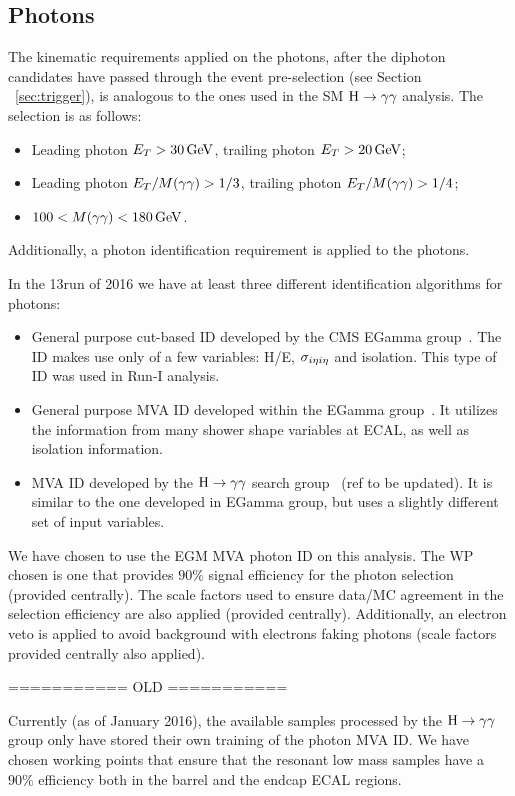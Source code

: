 \subsection{Photons}
\label{sec:photons}

The kinematic requirements applied on the photons, after the diphoton candidates have passed through the event pre-selection (see Section ~\ref{sec:trigger}), is analogous to the ones used in the SM $\mathrm{H}\to\gamma\gamma$ analysis. The selection is as follows:
\begin{itemize}
\item Leading photon $E_{T} > 30 \,\text{Ge\hspace{-.08em}V}$, trailing photon $E_{T}>20 \,\text{Ge\hspace{-.08em}V}$;
\item Leading photon $E_{T}/M(\gamma\gamma) > 1/3$, trailing photon $E_{T}/M(\gamma\gamma) > 1/4$;
\item $100 < M(\gamma\gamma) < 180 \,\text{Ge\hspace{-.08em}V}$.
\end{itemize}
Additionally, a photon identification requirement is applied to the photons.

In the 13\TeV run of 2016 we have at least three different identification algorithms for
photons:
\begin{itemize}
\item General purpose cut-based ID developed by the CMS EGamma
  group~\cite{PhotonCutBasedID-twiki}. The ID makes use only of a few variables: H/E,
  $\sigma_{i\eta i\eta}$ and isolation. This type of ID was used in Run-I analysis.
\item General purpose MVA ID developed within the EGamma
  group~\cite{PhotonMvaID-twiki}. It utilizes the information from many shower shape
  variables at ECAL, as well as isolation information.
\item MVA ID developed by the $\mathrm{H}\to\gamma\gamma$ search group~\cite{HggMvaID-slides} (ref to be
  updated). It is similar to the one developed in EGamma group, but uses a slightly
  different set of input variables.
\end{itemize}

We have chosen to use the EGM MVA photon ID on this analysis. 
The WP chosen is one that provides $90\%$ signal efficiency for the photon selection (provided centrally). 
The scale factors used to ensure data/MC agreement in the selection efficiency are also applied (provided centrally).
Additionally, an electron veto is applied to avoid background with electrons faking photons (scale factors provided centrally also applied).

=========== OLD ===========

Currently (as of January 2016), the available samples processed by the $\mathrm{H}\to\gamma\gamma$ group only have stored 
their own training of the photon MVA ID. 
We have chosen working points that ensure that the resonant low mass samples have 
a $90\%$ efficiency both in the barrel and the endcap ECAL regions. 

